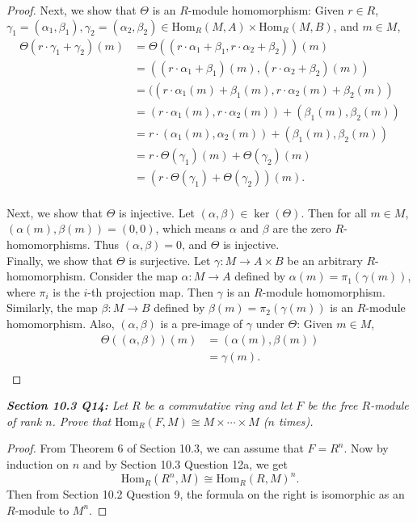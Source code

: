 \documentclass{article}
\begin{document}
\begin{enumerate}[label={\bf(\alph*)}]
\begin{proof}
        Next, we show that $\Theta$ is an $R$-module homomorphism: Given
        $r\in R$, $\gamma_1=(\alpha_1,\beta_1),
        \gamma_2=(\alpha_2,\beta_2)\in \text{Hom}_R(M,A)
        \times\text{Hom}_R(M,B)$, and $m\in M$,
        \begin{align*}
          \Theta(r\cdot\gamma_1+\gamma_2)(m)
            &=\Theta((r\cdot\alpha_1+\beta_1, r\cdot\alpha_2+\beta_2))(m)\\
          &=((r\cdot\alpha_1+\beta_1)(m), (r\cdot\alpha_2+\beta_2)(m))\\
          &=((r\cdot\alpha_1(m)+\beta_1(m), r\cdot\alpha_2(m)+\beta_2(m))\\
          &=(r\cdot\alpha_1(m), r\cdot\alpha_2(m)) +(\beta_1(m),\beta_2(m))\\
          &=r\cdot(\alpha_1(m),\alpha_2(m)) +(\beta_1(m),\beta_2(m))\\
          &=r\cdot\Theta(\gamma_1)(m) +\Theta(\gamma_2)(m)\\
          &=(r\cdot\Theta(\gamma_1)+\Theta(\gamma_2))(m).\\
        \end{align*}

        Next, we show that $\Theta$ is injective. Let
        $(\alpha,\beta)\in\ker(\Theta)$. Then for all $m\in M$,
        $(\alpha(m),\beta(m))=(0,0)$, which means $\alpha$ and $\beta$ are
        the zero $R$-homomorphisms. Thus $(\alpha,\beta)=0$, and $\Theta$
        is injective. \\

        Finally, we show that $\Theta$ is surjective. Let
        $\gamma:M\rightarrow A\times B$ be an arbitrary $R$-homomorphism.
        Consider the map $\alpha:M\rightarrow A$ defined by
        $\alpha(m)=\pi_1(\gamma(m))$, where $\pi_i$ is the $i$-th
        projection map. Then $\gamma$ is an $R$-module homomorphism.
        Similarly, the map $\beta:M\rightarrow B$ defined by
        $\beta(m)=\pi_2(\gamma(m))$ is an $R$-module homomorphism. Also,
        $(\alpha,\beta)$ is a pre-image of $\gamma$ under $\Theta$: Given
        $m\in M$,
        \begin{align*}
          \Theta((\alpha,\beta))(m) &=(\alpha(m),\beta(m))\\
          &=\gamma(m).\\
        \end{align*}
      \end{proof}
  \end{enumerate}

\it \textbf{Section 10.3 Q14:} Let $R$ be a commutative ring and let $F$ be
  the free $R$-module of rank $n$. Prove that $\text{Hom}_R(F,M) \cong
  M\times\cdots\times M$ ($n$ times).

  \begin{proof}
    From Theorem 6 of Section 10.3, we can assume that $F=R^n$. Now by
    induction on $n$ and by Section 10.3 Question 12a, we get
    \[\text{Hom}_R(R^n,M) \cong\text{Hom}_R(R,M)^n.\]
    Then from Section 10.2 Question 9, the formula on the right is
    isomorphic as an $R$-module to $M^n$.
  \end{proof}
\end{document}
